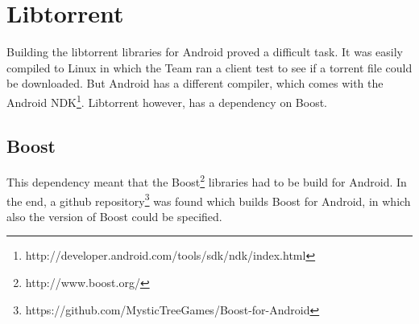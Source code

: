 \chapter{Libtorrent}
\thispagestyle{fancy}
\label{sec:libtorrent_impl}
Building the libtorrent libraries for Android proved a difficult task. It was easily compiled to Linux in which the Team ran a client test to see if a torrent file could be downloaded. But Android has a different compiler, which comes with the Android NDK\footnote{http://developer.android.com/tools/sdk/ndk/index.html}. Libtorrent however, has a dependency on Boost.

\section{Boost}
This dependency meant that the Boost\footnote{http://www.boost.org/} libraries had to be build for Android. In the end, a github repository\footnote{https://github.com/MysticTreeGames/Boost-for-Android} was found which builds Boost for Android, in which also the version of Boost could be specified.